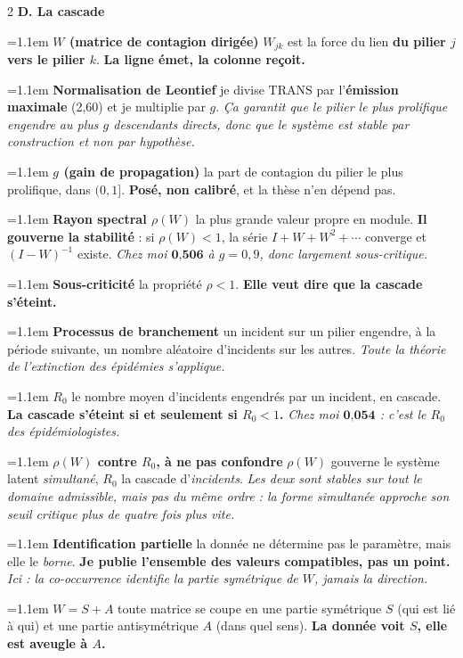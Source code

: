 \documentclass[9pt,a4paper]{article}
\newcommand{\n}[1]{\textbf{#1}}
\newcommand{\dfn}[2]{\noindent\hangindent=1.1em\hangafter=1
  {\color{warm}\bfseries #1} \textemdash{} #2\par\smallskip}
\begin{document}
\begin{multicols}{2}
\vspace{3pt}
{\color{navy}\bfseries D. La cascade}

\dfn{$W$ (matrice de contagion dirigée)}{$W_{jk}$ est la force du lien \n{du pilier $j$ vers
le pilier $k$}. \n{La ligne émet, la colonne reçoit.}}

\dfn{Normalisation de Leontief}{je divise $\mathrm{TRANS}$ par l'\n{émission maximale} (2,60)
et je multiplie par $g$. \emph{Ça garantit que le pilier le plus prolifique engendre au plus
$g$ descendants directs, donc que le système est stable par construction et non par
hypothèse.}}

\dfn{$g$ (gain de propagation)}{la part de contagion du pilier le plus prolifique, dans
$(0,1]$. \n{Posé, non calibré}, et la thèse n'en dépend pas.}

\dfn{Rayon spectral $\rho(W)$}{la plus grande valeur propre en module. \n{Il gouverne la
stabilité} : si $\rho(W)<1$, la série $I+W+W^2+\cdots$ converge et $(I-W)^{-1}$ existe.
\emph{Chez moi $\n{0{,}506}$ à $g=0{,}9$, donc largement sous-critique.}}

\dfn{Sous-criticité}{la propriété $\rho<1$. \n{Elle veut dire que la cascade s'éteint.}}

\dfn{Processus de branchement}{un incident sur un pilier engendre, à la période suivante, un
nombre aléatoire d'incidents sur les autres. \emph{Toute la théorie de l'extinction des
épidémies s'applique.}}

\dfn{$R_0$}{le nombre moyen d'incidents engendrés par un incident, en cascade. \n{La cascade
s'éteint si et seulement si $R_0<1$.} \emph{Chez moi $\n{0{,}054}$ : c'est le $R_0$ des
épidémiologistes.}}

\dfn{$\rho(W)$ contre $R_0$, à ne pas confondre}{$\rho(W)$ gouverne le système latent
\emph{simultané}, $R_0$ la cascade d'\emph{incidents}. \emph{Les deux sont stables sur tout
le domaine admissible, mais pas du même ordre : la forme simultanée approche son seuil
critique plus de quatre fois plus vite.}}

\dfn{Identification partielle}{la donnée ne détermine pas le paramètre, mais elle le
\emph{borne}. \n{Je publie l'ensemble des valeurs compatibles, pas un point.} \emph{Ici : la
co-occurrence identifie la partie symétrique de $W$, jamais la direction.}}

\dfn{$W=S+A$}{toute matrice se coupe en une partie symétrique $S$ (qui est lié à qui) et une
partie antisymétrique $A$ (dans quel sens). \n{La donnée voit $S$, elle est aveugle à $A$.}}


\end{multicols}
\end{document}
